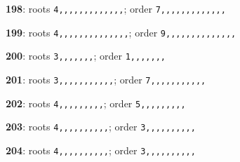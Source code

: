 \noindent \textbf{198}: roots \texttt{4,,,,,,,,,,,,,}; order \texttt{7,,,,,,,,,,,,,}\par
\noindent \textbf{199}: roots \texttt{4,,,,,,,,,,,,,,}; order \texttt{9,,,,,,,,,,,,,,}\par
\noindent \textbf{200}: roots \texttt{3,,,,,,,}; order \texttt{1,,,,,,,}\par
\noindent \textbf{201}: roots \texttt{3,,,,,,,,,,,}; order \texttt{7,,,,,,,,,,,}\par
\noindent \textbf{202}: roots \texttt{4,,,,,,,,,}; order \texttt{5,,,,,,,,,}\par
\noindent \textbf{203}: roots \texttt{4,,,,,,,,,,}; order \texttt{3,,,,,,,,,,}\par
\noindent \textbf{204}: roots \texttt{4,,,,,,,,,,}; order \texttt{3,,,,,,,,,,}\par
